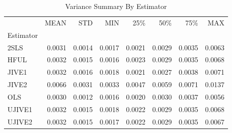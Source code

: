 \begin{table}[ht]
\centering
\caption{Variance Summary By Estimator}
\begin{tabular}{lrrrrrrr}
\toprule
 & MEAN & STD & MIN & 25\% & 50\% & 75\% & MAX \\
Estimator &  &  &  &  &  &  &  \\
\midrule
2SLS & 0.0031 & 0.0014 & 0.0017 & 0.0021 & 0.0029 & 0.0035 & 0.0063 \\
HFUL & 0.0032 & 0.0015 & 0.0016 & 0.0023 & 0.0029 & 0.0035 & 0.0068 \\
JIVE1 & 0.0032 & 0.0016 & 0.0018 & 0.0021 & 0.0027 & 0.0038 & 0.0071 \\
JIVE2 & 0.0066 & 0.0031 & 0.0033 & 0.0047 & 0.0059 & 0.0071 & 0.0137 \\
OLS & 0.0030 & 0.0012 & 0.0016 & 0.0020 & 0.0030 & 0.0037 & 0.0056 \\
UJIVE1 & 0.0032 & 0.0015 & 0.0018 & 0.0022 & 0.0029 & 0.0035 & 0.0068 \\
UJIVE2 & 0.0032 & 0.0015 & 0.0017 & 0.0022 & 0.0029 & 0.0035 & 0.0067 \\
\bottomrule
\end{tabular}
\end{table}
